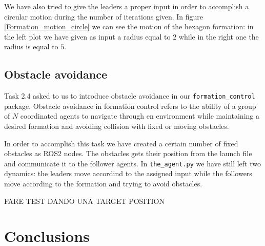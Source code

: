 \documentclass[a4paper,11pt,oneside]{book}
\begin{document}
\bigskip
We have also tried to give the leaders a proper input in order to accomplish a circular motion during the number of iterations given. In figure \ref{Formation_motion_circle} we can see the motion of the hexagon formation: in the left plot we have given as input a radius equal to $2$ while in the right one the radius is equal to $5$.



\section{Obstacle avoidance}
Task 2.4 asked to us to introduce obstacle avoidance in our \texttt{formation\_control} package. Obstacle avoidance in formation control refers to the ability of a group of $N$ coordinated agents to navigate through en environment while maintaining a desired formation and avoiding collision with fixed or moving obstacles.

In order to accomplish this task we have created a certain number of fixed obstacles as ROS2 nodes. The obstacles gets their position from the launch file and communicate it to the follower agents. 
In \texttt{the\_agent.py} we have still left two dynamics: the leaders move accordind to the assigned input while the followers move according to the formation and trying to avoid obstacles.



FARE TEST DANDO UNA TARGET POSITION


\chapter*{Conclusions}


%


\end{document}
